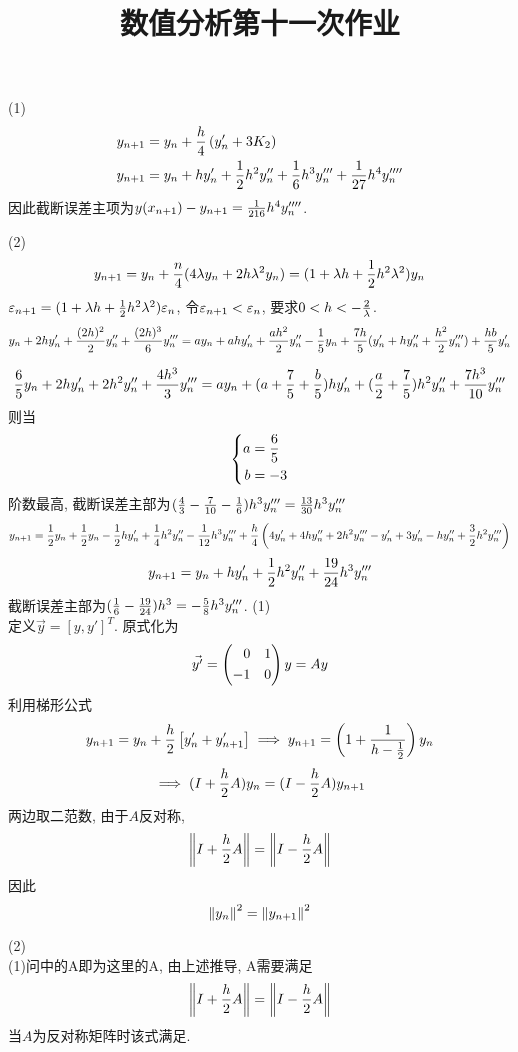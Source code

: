 \documentclass[UTF8,9pt]{ctexart}
\title{数值分析第十一次作业}
\begin{document}
 
\maketitle
{}
(1)\\
$$\begin{aligned} 
  y_{n+1} &= y_n+\frac{h}{4}\left( y_n'+3K_2 \right)\\
  y_{n+1} &= y_n +hy'_n +\frac{1}{2}h^2y''_n+\frac{1}{6}h^3y'''_n+\frac{1}{27}h^4y''''_n
 \end{aligned}$$
因此截断误差主项为$y(x_{n+1})-y_{n+1}=\frac{1}{216}h^4y''''_n$.

(2)\\
$$y_{n+1}=y_n+\frac{n}{4}(4\lambda y_n+2h\lambda^2y_n)=(1+\lambda h+\frac{1}{2}h^2\lambda^2)y_n$$
$\varepsilon_{n+1} = (1+\lambda h+\frac{1}{2}h^2\lambda^2)\varepsilon_n$, 令$\varepsilon_{n+1}<\varepsilon_n$, 要求$0<h<-\frac{2}{\lambda}$.
$$y_n+2hy_n'+\frac{(2h)^2}{2}y_n''+\frac{(2h)^3}{6}y_n''' = ay_n+ahy'_n+\frac{ah^2}{2}y''_n-\frac{1}{5}y_n+\frac{7h}{5}(y'_n+hy''_n+\frac{h^2}{2}y'''_n)+\frac{hb}{5}y_n'$$

$$ \frac{6}{5}y_n+2hy_n'+2h^2y_n''+\frac{4h^3}{3}y_n''' 
=
 ay_n+(a+\frac{7}{5}+\frac{b}{5})hy'_n+(\frac{a}{2}+\frac{7}{5})h^2y''_n+\frac{7h^3}{10}y'''_n $$
 则当
 $$\left\{\begin{aligned} 
   a &= \frac{6}{5}\\
   b &= -3\\
  \end{aligned}\right.$$
 阶数最高, 截断误差主部为$(\frac{4}{3}-\frac{7}{10}-\frac{1}{6})h^3y'''_n = \frac{13}{30}h^3y'''_n$
 $$y_{n+1} = \frac{1}{2}y_n+\frac{1}{2}y_n - \frac{1}{2}hy'_n+\frac{1}{4}h^2y''_n-\frac{1}{12}h^3y'''_n+\frac{h}{4}\left( 4y'_n+4hy''_n+2h^2y'''_n-y'_n+3y'_n-hy''_n+\frac{3}{2}h^2y'''_n \right)$$
 $$y_{n+1} = y_n+hy'_n+\frac{1}{2}h^2y''_n+\frac{19}{24}h^3y'''_n$$
 截断误差主部为$(\frac{1}{6}-\frac{19}{24})h^3=-\frac{5}{8}h^3y'''_n$.
(1)\\
定义$\vec{y} = [y,y']^T$. 原式化为
$$\vec{y'} = \left( \begin{aligned} 0\quad &1\\-1\quad &0 \end{aligned} \right)y=Ay$$
利用梯形公式
$$ 
y_{n+1}=y_{n}+\frac{h}{2}\left[y'_n+y'_{n+1}\right] \implies y_{n+1} = \left( 1+\frac{1}{h-\frac{1}{2}} \right)y_n
 $$
$$\implies (I+\frac{h}{2}A)y_n = (I-\frac{h}{2}A)y_{n+1}$$
两边取二范数, 由于$A$反对称, 
$$\left\| I+\frac{h}{2}A \right\| = \left\| I-\frac{h}{2}A \right\|$$
因此$$\left\| y_n \right\|^2=\left\| y_{n+1} \right\|^2$$

(2)\\
(1)问中的A即为这里的A, 由上述推导, A需要满足
$$\left\| I+\frac{h}{2}A \right\| = \left\| I-\frac{h}{2}A \right\|$$
当$A$为反对称矩阵时该式满足. 
\end{document}
